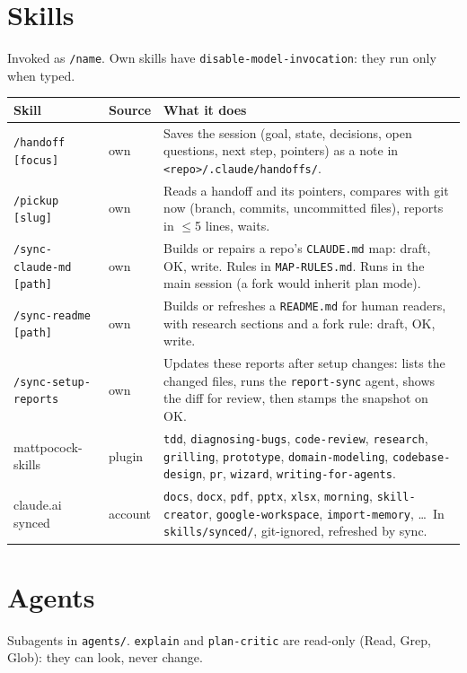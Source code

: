 \documentclass[10pt,a4paper]{article}
\newcommand{\p}[1]{\nolinkurl{#1}}
\begin{document}
\section{Skills}
Invoked as \p{/name}. Own skills have \p{disable-model-invocation}: they run only when typed.

\begin{tabularx}{\linewidth}{@{}l l L@{}}
\toprule
\textbf{Skill} & \textbf{Source} & \textbf{What it does} \\
\midrule
\texttt{/handoff [focus]} & own & Saves the session (goal, state, decisions, open questions, next step, pointers) as a note
  in \p{<repo>/.claude/handoffs/}. \\
\texttt{/pickup [slug]} & own & Reads a handoff and its pointers, compares with git now (branch, commits, uncommitted files),
  reports in $\le$5 lines, waits. \\
\texttt{/sync-claude-md [path]} & own & Builds or repairs a repo's \p{CLAUDE.md} map: draft, OK, write.
  Rules in \p{MAP-RULES.md}. Runs in the main session (a fork would inherit plan mode). \\
\texttt{/sync-readme [path]} & own & Builds or refreshes a \p{README.md} for human readers, with research sections and a fork
  rule: draft, OK, write. \\
\texttt{/sync-setup-reports} & own & Updates these reports after setup changes: lists the changed files, runs the
  \p{report-sync} agent, shows the diff for review, then stamps the snapshot on OK. \\
\midrule
mattpocock-skills & plugin & \p{tdd}, \p{diagnosing-bugs}, \p{code-review}, \p{research}, \p{grilling},
  \p{prototype}, \p{domain-modeling}, \p{codebase-design}, \p{pr}, \p{wizard}, \p{writing-for-agents}. \\
claude.ai synced & account & \p{docs}, \p{docx}, \p{pdf}, \p{pptx}, \p{xlsx}, \p{morning}, \p{skill-creator},
  \p{google-workspace}, \p{import-memory}, \dots\ In \p{skills/synced/}, git-ignored, refreshed by sync. \\
\bottomrule
\end{tabularx}

\section{Agents}
Subagents in \p{agents/}. \p{explain} and \p{plan-critic} are read-only (Read, Grep, Glob): they can look, never change.
\end{document}
